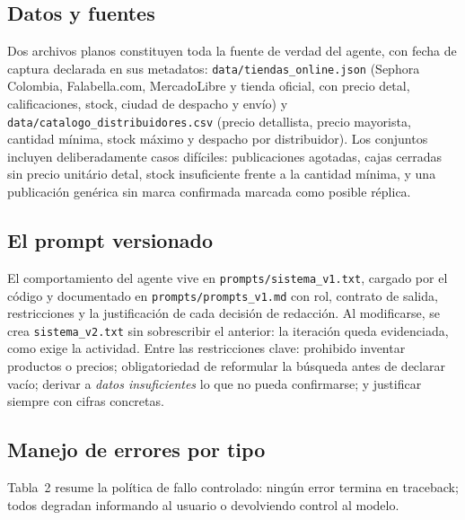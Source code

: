 \documentclass[11pt,letterpaper]{article}
\begin{document}
\subsection*{Datos y fuentes}

Dos archivos planos constituyen toda la fuente de verdad del agente, con fecha de captura declarada
en sus metadatos: \texttt{data/tiendas\_online.json} (Sephora Colombia, Falabella.com, MercadoLibre y
tienda oficial, con precio detal, calificaciones, stock, ciudad de despacho y envío) y
\texttt{data/catalogo\_distribuidores.csv} (precio detallista, precio mayorista, cantidad mínima,
stock máximo y despacho por distribuidor). Los conjuntos incluyen deliberadamente casos difíciles:
publicaciones agotadas, cajas cerradas sin precio unitário detal, stock insuficiente frente a la
cantidad mínima, y una publicación genérica sin marca confirmada marcada como posible réplica.

\subsection*{El prompt versionado}

El comportamiento del agente vive en \texttt{prompts/sistema\_v1.txt}, cargado por el código y
documentado en \texttt{prompts/prompts\_v1.md} con rol, contrato de salida, restricciones y la
justificación de cada decisión de redacción. Al modificarse, se crea \texttt{sistema\_v2.txt} sin
sobrescribir el anterior: la iteración queda evidenciada, como exige la actividad. Entre las
restricciones clave: prohibido inventar productos o precios; obligatoriedad de reformular la búsqueda
antes de declarar vacío; derivar a \emph{datos insuficientes} lo que no pueda confirmarse; y
justificar siempre con cifras concretas.

\subsection*{Manejo de errores por tipo}

Tabla~2 resume la política de fallo controlado: ningún error termina en traceback; todos degradan
informando al usuario o devolviendo control al modelo.
\end{document}
